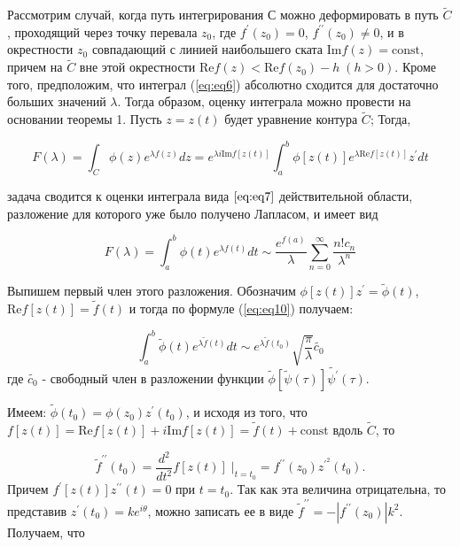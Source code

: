 \documentclass[14pt]{extarticle}
\renewcommand{\Re}{\mathrm{Re}}
\renewcommand{\Im}{\mathrm{Im}}
\newcommand{\const}{\mathrm{const}}
\begin{document}
Рассмотрим  случай, когда путь интегрирования $С$ можно деформировать в путь $\widetilde{C}$, проходящий через точку перевала $z_0$, где $f^\prime(z_0) = 0$, $f^{\prime\prime}(z_0)\neq0$, и в окрестности $z_0$ совпадающий с линией наибольшего ската $\Im f(z) = \const$, причем на $\widetilde{C}$ вне этой окрестности $\Re f(z) < \Re f(z_0) - h \;(h> 0)$. Кроме того, предположим, что интеграл (\ref{eq:eq6}) абсолютно сходится для достаточно больших значений $\lambda$.
Тогда образом, оценку интеграла можно провести на основании теоремы 1. Пусть $z = z(t)$ будет уравнение контура $\widetilde{C}$; Тогда,

\begin{equation}\label{eq:eq11}
F(\lambda) = \int_{C}^{}\phi(z) e^{\lambda f(z)}dz=e^{\lambda i \Im f[z(t)]}\int_{a}^{b}\phi[z(t)]e^{\lambda \Re f[z(t)]}z^{\prime} dt
\end{equation}

задача сводится к оценки интеграла вида $\ref{eq:eq7}$ действительной области, разложение для которого уже было получено Лапласом, и имеет вид

$$
F(\lambda) = \int_{a}^{b}\phi(t)e^{\lambda f(t)}dt \sim \frac{e^{f(a)}}{\lambda}\sum_{n=0}^{\infty}\frac{n! c_n}{\lambda^n}
$$
  
Выпишем первый член этого разложения.\cite{Lavrentyev} Обозначим $\phi[z(t)]z^\prime = \widetilde{\phi}(t)$, $\Re f[z(t)] = \widetilde{f}(t)$ и тогда по формуле (\ref{eq:eq10}) получаем:

\begin{equation}\label{eq:eq12}
\int_{a}^{b} \widetilde{\phi}(t) e^{\lambda \widetilde{f}(t)}dt \sim e^{\lambda \widetilde{f}(t_0)} \sqrt{\frac{\pi}{\lambda}} \widetilde{c_0}
\end{equation}
где $\widetilde{c_0}$ - свободный член в разложении функции $\widetilde{\phi}[\widetilde{\psi}(\tau)]\widetilde{\psi^\prime}(\tau)$.

Имеем: $\widetilde{\phi}(t_0) = \phi(z_0) z^\prime (t_0)$, и исходя из того, что $f[z(t)] = \Re f[z(t)]+ i \Im f[z(t)] = \widetilde{f}(t)+\const$ вдоль $\widetilde{C}$, то

\begin{equation}\nonumber
\widetilde{f}^{\prime\prime} (t_0) = \frac{d^2}{d t^2} f[z(t)]\;|_{t=t_0} = f^{\prime\prime} (z_0) z^{\prime^2} (t_0).
\end{equation}
Причем $f^\prime[z(t)] z^{\prime \prime} (t) = 0$ при $t=t_0$. Так как эта величина отрицательна, то представив $z^\prime (t_0) = k e^{i \theta}$, можно записать ее в виде $\widetilde{f}^{\prime\prime}=-|f^{\prime\prime}(z_0)| k^2$. Получаем, что 
\end{document}
